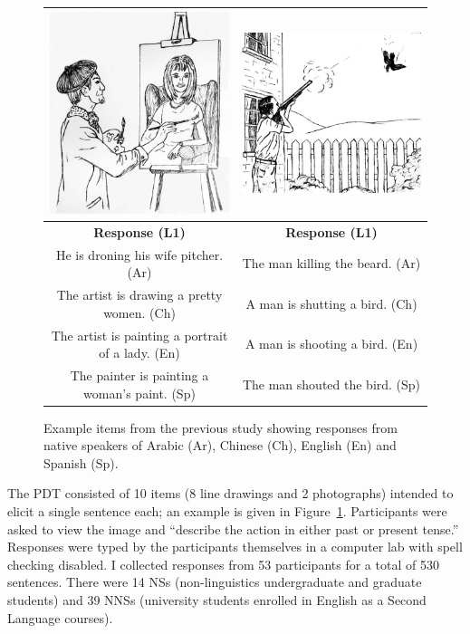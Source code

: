 \begin{figure}[htb!]
\begin{center}
\begin{tabular}{|c||c|}
\hline
\includegraphics[width=0.40\columnwidth]{figures/exampleprompt.jpg} & \includegraphics[width=0.40\columnwidth]{figures/exampleprompt2.jpg}\\
\hline
\textbf{Response (L1)} & \textbf{Response (L1)} \\
\hline
He is droning his wife pitcher. (Ar) & The man killing the beard. (Ar) \\
\hline
The artist is drawing a pretty women. (Ch) & A man is shutting a bird. (Ch) \\
\hline
The artist is painting a portrait of a lady. (En) & A man is shooting a bird. (En) \\
\hline
The painter is painting a woman's paint. (Sp) & The man shouted the bird. (Sp)\\
\hline
\end{tabular}
\end{center}
\caption{Example items from the previous study showing responses from native speakers of Arabic (Ar), Chinese (Ch), English (En) and Spanish (Sp).}
\label{fig:example-picture}
\end{figure}

The PDT consisted of 10 items (8 line drawings and 2 photographs) intended to elicit a single sentence each; an example is given in Figure~\ref{fig:example-picture}. Participants were asked to view the image and ``describe the action in either past or present tense.'' Responses were typed by the participants themselves in a computer lab with spell checking disabled.
I collected responses from 53 participants for a total of 530 sentences. There were 14 NSs (non-linguistics undergraduate and graduate students) and 39 NNSs (university students enrolled in English as a Second Language courses).

